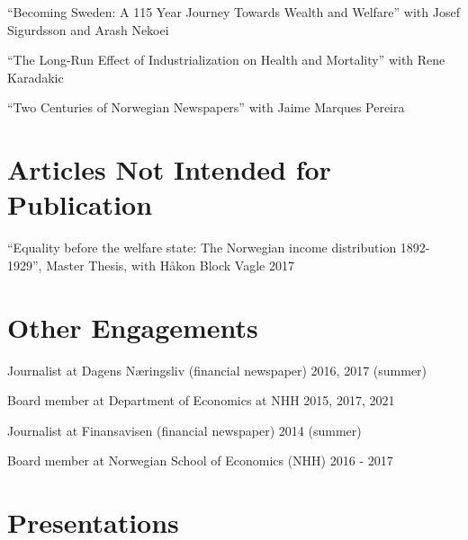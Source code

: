 \documentclass[11pt,]{article}
\begin{document}
``Becoming Sweden: A 115 Year Journey Towards Wealth and Welfare'' with
Josef Sigurdsson and Arash Nekoei\vspace{-0.2cm}

``The Long-Run Effect of Industrialization on Health and Mortality''
with Rene Karadakic\vspace{-0.2cm}

``Two Centuries of Norwegian Newspapers'' with Jaime Marques
Pereira\vspace{-0.2cm}

\vspace{0.5cm}

\hypertarget{articles-not-intended-for-publication}{%
\section{Articles Not Intended for
Publication}\label{articles-not-intended-for-publication}}

``Equality before the welfare state: The Norwegian income distribution
1892-1929'', Master Thesis, with Håkon Block Vagle
\hfill 2017\vspace{-0.2cm}

\vspace{0.5cm}

\hypertarget{other-engagements}{%
\section{Other Engagements}\label{other-engagements}}

Journalist at Dagens Næringsliv (financial newspaper) \hfill 2016, 2017
(summer)\vspace{-0.2cm}

Board member at Department of Economics at NHH \hfill 2015, 2017,
2021\vspace{-0.2cm}

Journalist at Finansavisen (financial newspaper) \hfill 2014
(summer)\vspace{-0.2cm}

Board member at Norwegian School of Economics (NHH) \hfill 2016 -
2017\vspace{-0.2cm}

\vspace{0.5cm}

\hypertarget{presentations}{%
\section{Presentations}\label{presentations}}
\end{document}
